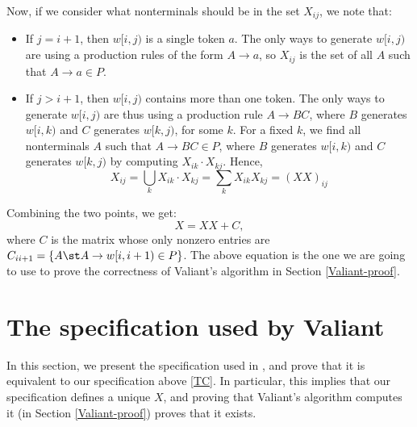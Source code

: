 Now, if we consider what nonterminals should be in the set $X_{i j}$, we note that:
\begin{itemize}
\item If $j = i + 1$, then $w[i,j)$ is a single token $a$. The only ways to generate $w[i,j)$ are using a production rules of the form $A \to a$, so $X_{i j}$ is the set of all $A$ such that $A \to a \in P$.
\item If $j > i + 1$, then $w[i,j)$ contains more than one token. The only ways to generate $w[i,j)$ are thus using a production rule $A \to BC$, where $B$ generates $w[i,k)$ and $C$ generates $w[k,j)$, for some $k$. For a fixed $k$, we find all nonterminals $A$ such that $A \to BC \in P$, where $B$ generates $w[i,k)$ and $C$ generates $w[k,j)$ by computing $X_{i k} \cdot X_{k j}$. Hence, 
            \begin{equation}
              X_{i j} = \bigcup_k X_{i k}\cdot X_{k j} = \sum_kX_{i k}X_{k j} = (XX)_{i j}
            \end{equation}
\end{itemize}
Combining the two points, we get:
\begin{equation}
  \label{TC}
  X = XX + C,
\end{equation}
where $C$ is the matrix whose only nonzero entries are $C_{i i+1} = \{A \st A \to w[i,i+1) \in P\}$. The above equation is the one we are going to use to prove the correctness of Valiant's algorithm in Section \ref{Valiant-proof}. 




\section{The specification used by Valiant}
\label{Valiant's-spec}
In this section, we present the specification used in \cite{Valiant}, and prove that it is equivalent to our specification above \eqref{TC}. In particular, this implies that our specification defines a unique $X$, and proving that Valiant's algorithm computes it (in Section \ref{Valiant-proof}) proves that it exists.

